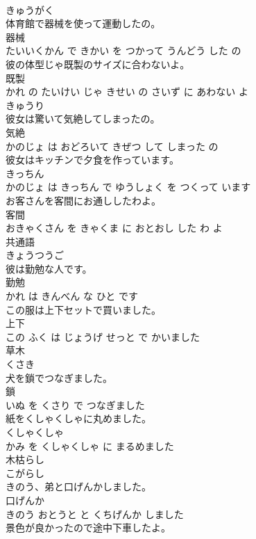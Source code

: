 \documentclass[8pt]{extreport}
\begin{document}
\begin{CJK}{UTF8}{min}
\\	きゅうがく		
\\	体育館で器械を使って運動したの。	
\\	器械 
\\	たいいくかん で きかい を つかって うんどう した の			
\\	彼の体型じゃ既製のサイズに合わないよ。	
\\	既製 
\\	かれ の たいけい じゃ きせい の さいず に あわない よ			
\\	きゅうり	
\\	彼女は驚いて気絶してしまったの。	
\\	気絶 
\\	かのじょ は おどろいて きぜつ して しまった の			
\\	彼女はキッチンで夕食を作っています。	
\\	きっちん 
\\	かのじょ は きっちん で ゆうしょく を つくって います			
\\	お客さんを客間にお通ししたわよ。	
\\	客間 
\\	おきゃくさん を きゃくま に おとおし した わ よ			
\\	共通語	
\\	きょうつうご		
\\	彼は勤勉な人です。	
\\	勤勉 
\\	かれ は きんべん な ひと です			
\\	この服は上下セットで買いました。	
\\	上下 
\\	この ふく は じょうげ せっと で かいました			
\\	草木	
\\	くさき		
\\	犬を鎖でつなぎました。	
\\	鎖 
\\	いぬ を くさり で つなぎました			
\\	紙をくしゃくしゃに丸めました。	
\\	くしゃくしゃ 
\\	かみ を くしゃくしゃ に まるめました			
\\	木枯らし	
\\	こがらし		
\\	きのう、弟と口げんかしました。	
\\	口げんか 
\\	きのう おとうと と くちげんか しました			
\\	景色が良かったので途中下車したよ。	

\end{CJK}
\end{document}
